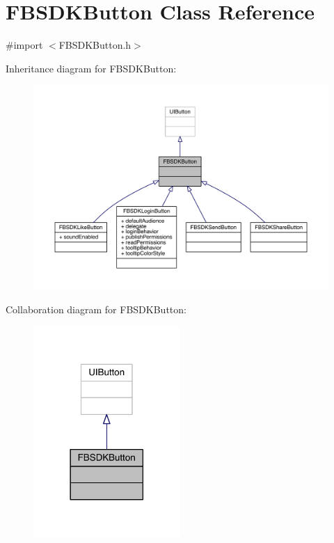 \hypertarget{interface_f_b_s_d_k_button}{\section{F\-B\-S\-D\-K\-Button Class Reference}
\label{interface_f_b_s_d_k_button}
}


{\ttfamily \#import $<$F\-B\-S\-D\-K\-Button.\-h$>$}



Inheritance diagram for F\-B\-S\-D\-K\-Button\-:
\nopagebreak
\begin{figure}[H]
\begin{center}
\leavevmode
\includegraphics[width=350pt]{interface_f_b_s_d_k_button__inherit__graph}
\end{center}
\end{figure}


Collaboration diagram for F\-B\-S\-D\-K\-Button\-:
\nopagebreak
\begin{figure}[H]
\begin{center}
\leavevmode
\includegraphics[width=158pt]{interface_f_b_s_d_k_button__coll__graph}
\end{center}
\end{figure}


